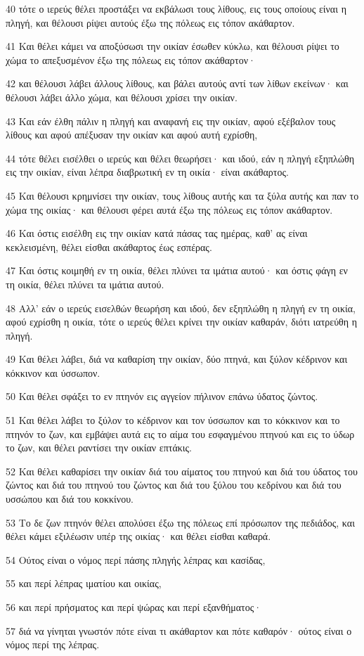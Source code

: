 \par 40 τότε ο ιερεύς θέλει προστάξει να εκβάλωσι τους λίθους, εις τους οποίους είναι η πληγή, και θέλουσι ρίψει αυτούς έξω της πόλεως εις τόπον ακάθαρτον.
\par 41 Και θέλει κάμει να αποξύσωσι την οικίαν έσωθεν κύκλω, και θέλουσι ρίψει το χώμα το απεξυσμένον έξω της πόλεως εις τόπον ακάθαρτον·
\par 42 και θέλουσι λάβει άλλους λίθους, και βάλει αυτούς αντί των λίθων εκείνων· και θέλουσι λάβει άλλο χώμα, και θέλουσι χρίσει την οικίαν.
\par 43 Και εάν έλθη πάλιν η πληγή και αναφανή εις την οικίαν, αφού εξέβαλον τους λίθους και αφού απέξυσαν την οικίαν και αφού αυτή εχρίσθη,
\par 44 τότε θέλει εισέλθει ο ιερεύς και θέλει θεωρήσει· και ιδού, εάν η πληγή εξηπλώθη εις την οικίαν, είναι λέπρα διαβρωτική εν τη οικία· είναι ακάθαρτος.
\par 45 Και θέλουσι κρημνίσει την οικίαν, τους λίθους αυτής και τα ξύλα αυτής και παν το χώμα της οικίας· και θέλουσι φέρει αυτά έξω της πόλεως εις τόπον ακάθαρτον.
\par 46 Και όστις εισέλθη εις την οικίαν κατά πάσας τας ημέρας, καθ' ας είναι κεκλεισμένη, θέλει είσθαι ακάθαρτος έως εσπέρας.
\par 47 Και όστις κοιμηθή εν τη οικία, θέλει πλύνει τα ιμάτια αυτού· και όστις φάγη εν τη οικία, θέλει πλύνει τα ιμάτια αυτού.
\par 48 Αλλ' εάν ο ιερεύς εισελθών θεωρήση και ιδού, δεν εξηπλώθη η πληγή εν τη οικία, αφού εχρίσθη η οικία, τότε ο ιερεύς θέλει κρίνει την οικίαν καθαράν, διότι ιατρεύθη η πληγή.
\par 49 Και θέλει λάβει, διά να καθαρίση την οικίαν, δύο πτηνά, και ξύλον κέδρινον και κόκκινον και ύσσωπον.
\par 50 Και θέλει σφάξει το εν πτηνόν εις αγγείον πήλινον επάνω ύδατος ζώντος.
\par 51 Και θέλει λάβει το ξύλον το κέδρινον και τον ύσσωπον και το κόκκινον και το πτηνόν το ζων, και εμβάψει αυτά εις το αίμα του εσφαγμένου πτηνού και εις το ύδωρ το ζων, και θέλει ραντίσει την οικίαν επτάκις.
\par 52 Και θέλει καθαρίσει την οικίαν διά του αίματος του πτηνού και διά του ύδατος του ζώντος και διά του πτηνού του ζώντος και διά του ξύλου του κεδρίνου και διά του υσσώπου και διά του κοκκίνου.
\par 53 Το δε ζων πτηνόν θέλει απολύσει έξω της πόλεως επί πρόσωπον της πεδιάδος, και θέλει κάμει εξιλέωσιν υπέρ της οικίας· και θέλει είσθαι καθαρά.
\par 54 Ούτος είναι ο νόμος περί πάσης πληγής λέπρας και κασίδας,
\par 55 και περί λέπρας ιματίου και οικίας,
\par 56 και περί πρήσματος και περί ψώρας και περί εξανθήματος·
\par 57 διά να γίνηται γνωστόν πότε είναι τι ακάθαρτον και πότε καθαρόν· ούτος είναι ο νόμος περί της λέπρας.

